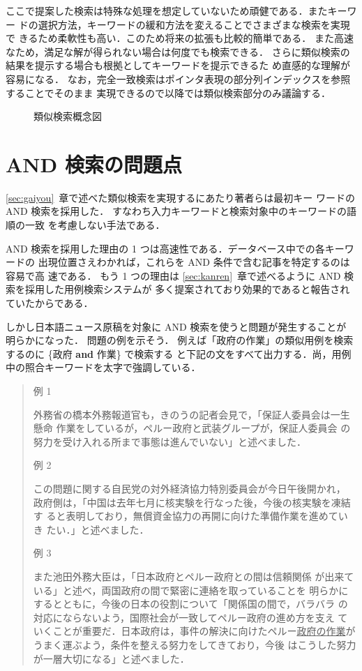 ここで提案した検索は特殊な処理を想定していないため頑健である．またキーワー
ドの選択方法，キーワードの緩和方法を変えることでさまざまな検索を実現で
きるため柔軟性も高い．このため将来の拡張も比較的簡単である．
また高速なため，満足な解が得られない場合は何度でも検索できる．
さらに類似検索の結果を提示する場合も根拠としてキーワードを提示できるた
め直感的な理解が容易になる．
なお，完全一致検索はポインタ表現の部分列インデックスを参照することでそのまま
実現できるので以降では類似検索部分のみ議論する．

\begin{figure}
 \begin{center}
  \caption{類似検索概念図}
  \label{fig:nagare}
 \end{center}
\end{figure}
\section{AND 検索の問題点}
\label{sec:mondai}
\ref{sec:gaiyou}~章で述べた類似検索を実現するにあたり著者らは最初キー
ワードの AND 検索を採用した\cite{Salt83}．
すなわち入力キーワードと検索対象中のキーワードの語順の一致
を考慮しない手法である．

AND 検索を採用した理由の 1 つは高速性である．データベース中での各キーワードの
出現位置さえわかれば，これらを AND 条件で含む記事を特定するのは容易で高
速である．
もう 1 つの理由は
\ref{sec:kanren}~章で述べるように AND 検索を採用した用例検索システムが
多く提案されており効果的であると報告されていたからである．

しかし日本語ニュース原稿を対象に AND 検索を使うと問題が発生することが
明らかになった．
問題の例を示そう．
例えば「政府の作業」の類似用例を検索するのに \{政府 {\bf and} 作業\} で検索する
と下記の文をすべて出力する．尚，用例中の照合キーワードを太字で強調している．
\smallskip
\begin{quote}
例 1

外務省の橋本外務報道官も，きのうの記者会見で，「保証人委員会は一生懸命
{\gt 作業}をしているが，ペルー{\gt 政府}と武装グループが，保証人委員会
の努力を受け入れる所まで事態は進んでいない」と述べました．

例 2

この問題に関する自民党の対外経済協力特別委員会が今日午後開かれ，{\gt 
政府}側は，「中国は去年七月に核実験を行なった後，今後の核実験を凍結す
ると表明しており，無償資金協力の再開に向けた準備{\gt 作業}を進めていき
たい．」と述べました．

例 3

また池田外務大臣は，「日本{\gt 政府}とペルー{\gt 政府}との間は信頼関係
が出来ている」と述べ，両国{\gt 政府}の間で緊密に連絡を取っていることを
明らかにするとともに，今後の日本の役割について「関係国の間で，バラバラ
の対応にならないよう，国際社会が一致してペルー{\gt 政府}の進め方を支え
ていくことが重要だ．日本{\gt 政府}は，事件の解決に向けたペルー\underline{{\gt 政府}の{\gt 作業}}がうまく運ぶよう，条件を整える努力をしてきており，今後
はこうした努力が一層大切になる」と述べました．
\end{quote}

